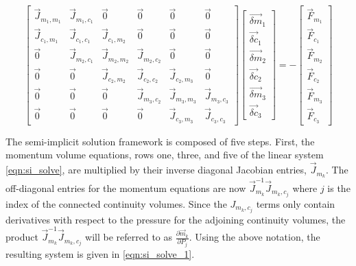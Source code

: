  \begin{equation}
 \label{eqn:si_solve}
 \begin{bmatrix} 
 \vec{J}_{m_1,m_1} & \vec{J}_{m_1,c_1} & \vec{0} & \vec{0} & \vec{0} & \vec{0}\\
 \vec{J}_{c_1,m_1} & \vec{J}_{c_1,c_1} & \vec{J}_{c_1,m_2} & \vec{0} & \vec{0} & \vec{0} \\
 \vec{0} & \vec{J}_{m_2,c_1} & \vec{J}_{m_2,m_2} & \vec{J}_{m_2,c_2} & \vec{0} & \vec{0} \\
 \vec{0} & \vec{0} & \vec{J}_{c_2,m_2} & \vec{J}_{c_2,c_2} & \vec{J}_{c_2,m_3} & \vec{0} \\
 \vec{0} & \vec{0} & \vec{0} & \vec{J}_{m_3,c_2} & \vec{J}_{m_3,m_3} & \vec{J}_{m_3,c_3} \\ 
 \vec{0} & \vec{0} & \vec{0} & \vec{0} & \vec{J}_{c_3,m_3} & \vec{J}_{c_3,c_3}  
 \end{bmatrix} \begin{bmatrix}
 \vec{\delta m}_{1} \\ \vec{\delta c}_{1} \\
 \vec{\delta m}_{2} \\ \vec{\delta c}_{2} \\
 \vec{\delta m}_{3} \\ \vec{\delta c}_{3}
\end{bmatrix}  = -\begin{bmatrix}
 \vec{F}_{m_1} \\ \vec{F}_{c_1} \\
 \vec{F}_{m_2} \\ \vec{F}_{c_2} \\
 \vec{F}_{m_3} \\ \vec{F}_{c_3} \end{bmatrix}
 \end{equation}
 
 The semi-implicit solution framework is composed of five steps.
 First, the momentum volume equations, rows one, three, and five of the linear system \eqref{eqn:si_solve}, are multiplied by their inverse diagonal Jacobian entries, $\vec{J}_{m_k}$.
 The off-diagonal entries for the momentum equations are now $\vec{J}^{-1}_{m_k}\vec{J}_{m_k,c_j}$ where $j$ is the index of the connected continuity volumes.
 Since the $J_{m_k,c_j}$ terms only contain derivatives with respect to the pressure for the adjoining continuity volumes, the product $\vec{J}^{-1}_{m_k}\vec{J}_{m_k,c_j}$ will be referred to as $\frac{\partial \vec{m}_k}{\partial P_j}$.
 Using the above notation, the resulting system is given in \eqref{eqn:si_solve_1}.
 
